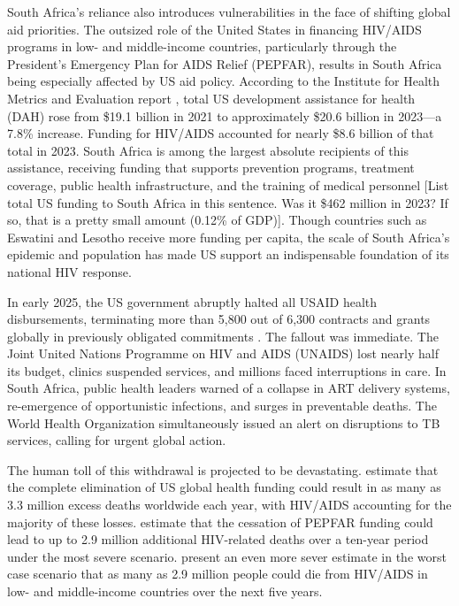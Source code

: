 \documentclass[letterpaper,12pt]{article}
\theoremstyle{definition}
\begin{document}
\begin{spacing}{1.5}
South Africa's reliance also introduces vulnerabilities in the face of shifting global aid priorities. The outsized role of the United States in financing HIV/AIDS programs in low- and middle-income countries, particularly through the President's Emergency Plan for AIDS Relief (PEPFAR), results in South Africa being especially affected by US aid policy. According to the Institute for Health Metrics and Evaluation report \citep{FGH2023}, total US development assistance for health (DAH) rose from \$19.1 billion in 2021 to approximately \$20.6 billion in 2023—a 7.8\% increase. Funding for HIV/AIDS accounted for nearly \$8.6 billion of that total in 2023. South Africa is among the largest absolute recipients of this assistance, receiving funding that supports prevention programs, treatment coverage, public health infrastructure, and the training of medical personnel [List total US funding to South Africa in this sentence. Was it \$462 million in 2023? If so, that is a pretty small amount (0.12\% of GDP)]. Though countries such as Eswatini and Lesotho receive more funding per capita, the scale of South Africa's epidemic and population has made US support an indispensable foundation of its national HIV response.

In early 2025, the US government abruptly halted all USAID health disbursements, terminating more than 5,800 out of 6,300 contracts and grants globally in previously obligated commitments \citep{Cohen2025}. The fallout was immediate. The Joint United Nations Programme on HIV and AIDS (UNAIDS) lost nearly half its budget, clinics suspended services, and millions faced interruptions in care. In South Africa, public health leaders warned of a collapse in ART delivery systems, re-emergence of opportunistic infections, and surges in preventable deaths. The World Health Organization simultaneously issued an alert on disruptions to TB services, calling for urgent global action.

The human toll of this withdrawal is projected to be devastating. \citet{KS2025} estimate that the complete elimination of US global health funding could result in as many as 3.3 million excess deaths worldwide each year, with HIV/AIDS accounting for the majority of these losses. \citet{Gandhi2025} estimate that the cessation of PEPFAR funding could lead to up to 2.9 million additional HIV-related deaths over a ten-year period under the most severe scenario.  present an even more sever estimate in the worst case scenario that as many as 2.9 million people could die from HIV/AIDS in low- and middle-income countries over the next five years.


\end{spacing}
\end{document}
